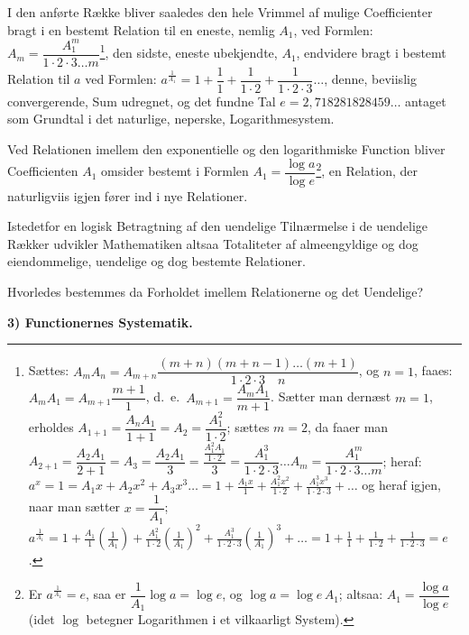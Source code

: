 \documentclass[12pt]{book}
\newcommand{\opage}[1]{\marginnote{\footnotesize\textit{[#1]}}}
\begin{document}
I den anførte Række bliver saaledes den hele Vrimmel af mulige Coefficienter
bragt i en bestemt Relation til en eneste, nemlig $A_1$, ved Formlen:
$A_m = \dfrac{A_1^{m}}{1\cdot 2\cdot 3\dots m}$\footnote{Sættes:
$A_m A_n = A_{m+n}\dfrac{(m+n)(m+n-1)\dots(m+1)}{1\cdot 2\cdot 3\quad n}$, og
$n = 1$, faaes: $A_m A_1 = A_{m+1}\dfrac{m+1}{1}$, d.\ e.\
$A_{m+1} = \dfrac{A_m A_1}{m+1}$. Sætter man dernæst $m = 1$, erholdes
$A_{1+1} = \dfrac{A_n A_1}{1+1} = A_2 = \dfrac{A_1^{2}}{1\cdot 2}$;
sættes $m = 2$, da faaer man $A_{2+1} = \dfrac{A_2 A_1}{2+1} = A_3 =
\dfrac{A_2 A_1}{3} = \dfrac{\frac{A_1^{2}A_1}{1\cdot 2}}{3} =
\dfrac{A_1^{3}}{1\cdot 2\cdot 3}\dots A_m = \dfrac{A_1^{m}}{1\cdot 2\cdot 3\dots
m}$; heraf:
$a^{x} = 1 = A_1 x + A_2 x^{2} + A_3 x^{3}\dots = 1 +
\frac{A_1 x}{1} + \frac{A_1^{2}x^{2}}{1\cdot 2} +
\frac{A_1^{3}x^{3}}{1\cdot 2\cdot 3} + \dots$
og heraf igjen, naar man sætter $x = \dfrac{1}{A_1}$;
$a^{\frac{1}{A_1}} = 1 + \frac{A_1}{1}\left(\frac{1}{A_1}\right) +
\frac{A_1^{2}}{1\cdot 2}\left(\frac{1}{A_1}\right)^{2} +
\frac{A_1^{3}}{1\cdot 2\cdot 3}\left(\frac{1}{A_1}\right)^{3} + \dots = 1 +
\frac{1}{1} + \frac{1}{1\cdot 2} + \frac{1}{1\cdot 2\cdot 3} = e$.}, den sidste,
eneste ubekjendte, $A_1$, endvidere bragt i bestemt Relation til $a$ ved
Formlen: $a^{\frac{1}{A_1}} = 1 + \dfrac{1}{1} + \dfrac{1}{1\cdot 2} +
\dfrac{1}{1\cdot 2\cdot 3}\dots$, denne, beviislig convergerende, Sum udregnet,
og det fundne Tal $e = 2{,}718281828459\dots$ antaget som Grundtal i det
naturlige, neperske, Logarithmesystem.

Ved Relationen imellem den exponentielle og den logarithmiske Function bliver
Coefficienten $A_1$ omsider bestemt i
\opage{31} Formlen $A_1 = \dfrac{\log a}{\log e}$\footnote{Er $a^{\frac{1}{A_1}} = e$, saa
er $\dfrac{1}{A_1}\log a = \log e$, og $\log a = \log e\, A_1$; altsaa:
$A_1 = \dfrac{\log a}{\log e}$ (idet $\log$ betegner Logarithmen i et vilkaarligt
System).}, en Relation, der naturligviis igjen fører ind i nye Relationer.

Istedetfor en logisk Betragtning af den uendelige Tilnærmelse i de uendelige
Rækker udvikler Mathematiken altsaa Totaliteter af almeengyldige og dog
eiendommelige, uendelige og dog bestemte Relationer.

Hvorledes bestemmes da Forholdet imellem Relationerne og det Uendelige?

\begin{center}
\textbf{3) Functionernes Systematik.}
\end{center}
{}
\end{document}
